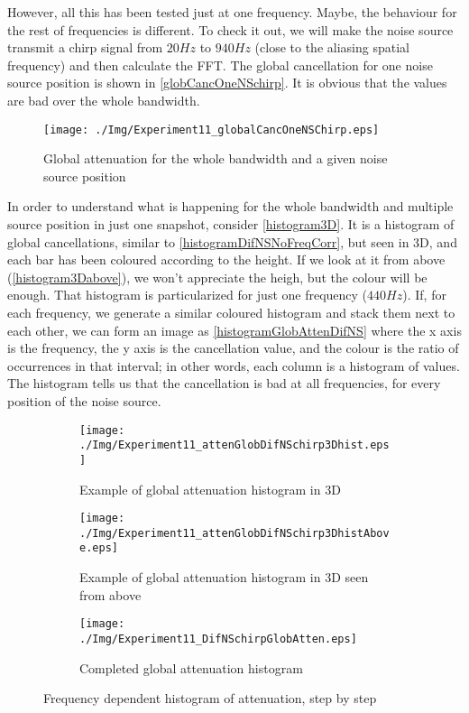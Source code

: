 However, all this has been tested just at one frequency. Maybe, the behaviour for the rest of frequencies is different. To check it out, we will make the noise source transmit a chirp signal from $20 \si{Hz}$ to $940 \si{Hz}$ (close to the aliasing spatial frequency) and then calculate the FFT. The global cancellation for one noise source position is shown in \autoref{globCancOneNSchirp}. It is obvious that the values are bad over the whole bandwidth.

\begin{figure}[h]
	\centering
	\texttt{[image: ./Img/Experiment11\_globalCancOneNSChirp.eps]}
	\caption{Global attenuation for the whole bandwidth and a given noise source position}
	\label{globCancOneNSchirp}
\end{figure}

In order to understand what is happening for the whole bandwidth and multiple source position in just one snapshot, consider \autoref{histogram3D}. It is a histogram of global cancellations, similar to \autoref{histogramDifNSNoFreqCorr}, but seen in 3D, and each bar has been coloured according to the height. If we look at it from above (\autoref{histogram3Dabove}), we won't appreciate the heigh, but the colour will be enough.
That histogram is particularized for just one frequency ($440\si{Hz}$). If, for each frequency, we generate a similar coloured histogram and stack them next to each other, we can form an image as \autoref{histogramGlobAttenDifNS} where the x axis is the frequency, the y axis is the cancellation value, and the colour is the ratio of occurrences in that interval; in other words, each column is a histogram of values. The histogram tells us that the cancellation is bad at all frequencies, for every position of the noise source.

\begin{figure}[h]
	\centering
	\begin{subfigure}[b]{0.49\textwidth}
	\centering
	\texttt{[image: ./Img/Experiment11\_attenGlobDifNSchirp3Dhist.eps]}
	\caption{Example of global attenuation histogram in 3D}
	\label{histogram3D}
	\end{subfigure}
	\begin{subfigure}[b]{0.49\textwidth}
		\centering
		\texttt{[image: ./Img/Experiment11\_attenGlobDifNSchirp3DhistAbove.eps]}
		\caption{Example of global attenuation histogram in 3D seen from above}
		\label{histogram3Dabove}
	\end{subfigure}
	\begin{subfigure}[b]{0.49\textwidth}
		\centering	\texttt{[image: ./Img/Experiment11\_DifNSchirpGlobAtten.eps]}
		\caption{Completed global attenuation histogram}
		\label{histogramGlobAttenDifNS}
	\end{subfigure}
\caption{Frequency dependent histogram of attenuation, step by step}
\end{figure}

